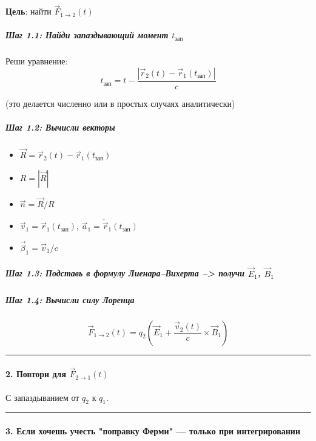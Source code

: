 \documentclass[11pt]{article}
\providecommand{\tightlist}{%
      \setlength{\itemsep}{0pt}\setlength{\parskip}{0pt}}
\begin{document}
\textbf{Цель}: найти \(\vec{F}_{1 \to 2}(t)\)

\subparagraph{\texorpdfstring{Шаг 1.1: Найди запаздывающий момент \(t_{\text{зап}}\)}
{Шаг 1.1: Найди запаздывающий момент t\_\{\textbackslash{}text\{зап\}\}}}

Реши уравнение: \[
t_{\text{зап}} = t - \frac{|\vec{r}_2(t) - \vec{r}_1(t_{\text{зап}})|}{c}
\]

(это делается численно или в простых случаях аналитически)

\subparagraph{Шаг 1.2: Вычисли векторы}

\begin{itemize}
\tightlist
\item
  \(\vec{R} = \vec{r}_2(t) - \vec{r}_1(t_{\text{зап}})\)
\item
  \(R = |\vec{R}|\)
\item
  \(\vec{n} = \vec{R}/R\)
\item
  \(\vec{v}_1 = \dot{\vec{r}}_1(t_{\text{зап}})\),
  \(\vec{a}_1 = \ddot{\vec{r}}_1(t_{\text{зап}})\)
\item
  \(\vec{\beta}_1 = \vec{v}_1 / c\)
\end{itemize}

\subparagraph{\texorpdfstring{Шаг 1.3: Подставь в формулу
Лиенара--Вихерта --> получи \(\vec{E}_1\),
\(\vec{B}_1\)}{Шаг 1.3: Подставь в формулу Лиенара--Вихерта --> получи \textbackslash{}vec\{E\}\_1, \textbackslash{}vec\{B\}\_1}}

\subparagraph{Шаг 1.4: Вычисли силу Лоренца}
\[
\vec{F}_{1 \to 2}(t) = q_2 \left( \vec{E}_1 + \frac{\vec{v}_2(t)}{c} \times \vec{B}_1 \right)
\]

\begin{center}\rule{0.5\linewidth}{\linethickness}\end{center}

\paragraph{\texorpdfstring{2. Повтори для \(\vec{F}_{2 \to 1}(t)\)}{2. Повтори для \textbackslash{}vec\{F\}\_\{2 \textbackslash{}to 1\}(t)}}

С запаздыванием от \(q_2\) к \(q_1\).

\begin{center}\rule{0.5\linewidth}{\linethickness}\end{center}

\paragraph{3. Если хочешь учесть "поправку Ферми" --- только при интегрировании}
\end{document}
